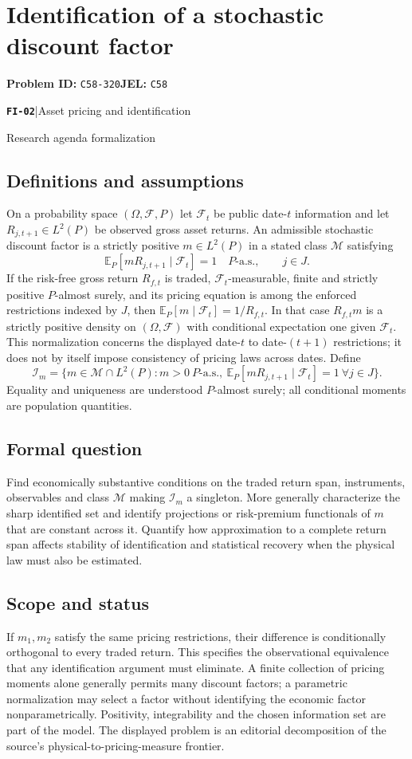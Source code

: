 \documentclass[11pt,a4paper]{article}
\newcommand{\E}{\mathbb E}
\newcommand{\entrymeta}[3]{{\sffamily\small\color{muted}\textbf{\texttt{#1}}\quad|\quad #2\par #3\par}}
\begin{document}
\section*{Identification of a stochastic discount factor}
\textbf{Problem ID:} \texttt{C58-320}\quad \textbf{JEL:} \texttt{C58}\par
\label{problem:OP-0579}
\label{beyond:FI-02}
\entrymeta{FI-02}{Asset pricing and identification}{Research agenda formalization}
\subsection*{Definitions and assumptions}
On a probability space $(\Omega,\mathcal F,P)$ let $\mathcal F_t$ be public date-$t$ information and let $R_{j,t+1}\in L^2(P)$ be observed gross asset returns. An admissible stochastic discount factor is a strictly positive $m\in L^2(P)$ in a stated class $\mathcal M$ satisfying
\[
 \E_P[mR_{j,t+1}\mid\mathcal F_t]=1\quad P\text{-a.s.},\qquad j\in J.
\]
If the risk-free gross return $R_{f,t}$ is traded, $\mathcal F_t$-measurable, finite and strictly positive $P$-almost surely, and its pricing equation is among the enforced restrictions indexed by $J$, then $\E_P[m\mid\mathcal F_t]=1/R_{f,t}$. In that case $R_{f,t}m$ is a strictly positive density on $(\Omega,\mathcal F)$ with conditional expectation one given $\mathcal F_t$. This normalization concerns the displayed date-$t$ to date-$(t+1)$ restrictions; it does not by itself impose consistency of pricing laws across dates. Define
\[
 \mathcal I_m=\{m\in\mathcal M\cap L^2(P):m>0\ P\text{-a.s.},\ \E_P[mR_{j,t+1}\mid\mathcal F_t]=1\ \forall j\in J\}.
\]
Equality and uniqueness are understood $P$-almost surely; all conditional moments are population quantities.
\subsection*{Formal question}
Find economically substantive conditions on the traded return span, instruments, observables and class $\mathcal M$ making $\mathcal I_m$ a singleton. More generally characterize the sharp identified set and identify projections or risk-premium functionals of $m$ that are constant across it. Quantify how approximation to a complete return span affects stability of identification and statistical recovery when the physical law must also be estimated.
\subsection*{Scope and status}
If $m_1,m_2$ satisfy the same pricing restrictions, their difference is conditionally orthogonal to every traded return. This specifies the observational equivalence that any identification argument must eliminate. A finite collection of pricing moments alone generally permits many discount factors; a parametric normalization may select a factor without identifying the economic factor nonparametrically. Positivity, integrability and the chosen information set are part of the model. The displayed problem is an editorial decomposition of the source's physical-to-pricing-measure frontier.
\end{document}
